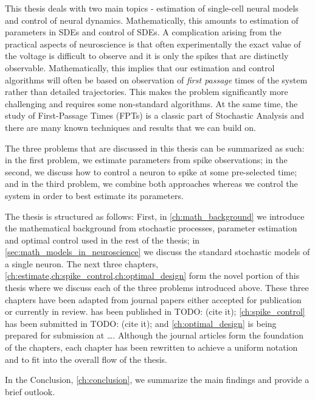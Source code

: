 \documentclass{report}
\begin{document}
This thesis deals with two main topics - estimation of single-cell neural models
and control of neural dynamics. Mathematically, this amounts to estimation of
parameters in SDEs and control of SDEs. A complication arising from the
practical aspects of neuroscience is that often experimentally the exact value
of the voltage is difficult to observe and it is only the spikes that are
distinctly observable. Mathematically, this implies that our estimation
and control algorithms will often be based on observation of {\sl first
passage} times of the system rather than detailed trajectories. This makes the problem
significantly more challenging and requires some non-standard
algorithms. At the same time, the study of First-Passage Times (FPTs) is a
classic part of Stochastic Analysis and there are many known
techniques and results that we can build on.

The three problems that are discussed in this thesis can be summarized as
such: in the first problem, we estimate parameters from spike observations; 
in the second, we discuss how to control a neuron to spike at some pre-selected
time; and in the third problem, we combine both approaches whereas we
control the system in order to best estimate its parameters.

The thesis is structured as follows: First, in \cref{ch:math_background} we
introduce the mathematical background from stochastic processes, parameter
estimation and optimal control used in the rest of the thesis; in
\cref{sec:math_models_in_neuroscience} we discuss the standard stochastic models
of a single neuron. The next three chapters,
\cref{ch:estimate,ch:spike_control,ch:optimal_design} form the novel portion of
this thesis where we discuss each of the three problems introduced above. These
three chapters have been adapted from journal papers either accepted for
publication or currently in review.  has been published in
TODO: (cite it); \cref{ch:spike_control} has been submitted in TODO: (cite it);
and \cref{ch:optimal_design} is being prepared for submission at \ldots.
Although the journal articles form the foundation of the chapters, each chapter
has been rewritten to achieve a uniform notation and to fit into the overall
flow of the thesis.

In the Conclusion, \cref{ch:conclusion}, we summarize the main findings and
provide a brief outlook.

\cleardoublepage

\cleardoublepage

\cleardoublepage

\cleardoublepage

\cleardoublepage
\end{document}
